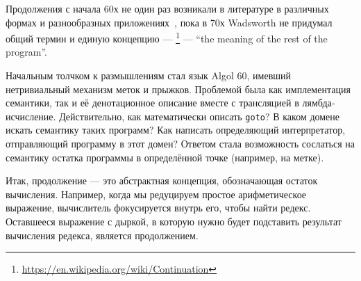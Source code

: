 
Продолжения с начала 60х не один раз возникали в литературе в различных формах и разнообразных приложениях~\cite{reynolds1993discoveries, landin1997histories}, пока в 70х Wadsworth не придумал общий термин и единую концепцию --- \footnote{\url{https://en.wikipedia.org/wiki/Continuation}} --- ``the meaning of the rest of the program''.

Начальным толчком к размышлениям стал язык Algol 60, имевший нетривиальный механизм меток и прыжков.
Проблемой была как имплементация семантики, так и её денотационное описание вместе с трансляцией в лямбда-исчисление.
Действительно, как математически описать \texttt{goto}?
В каком домене искать семантику таких программ?
Как написать определяющий интерпретатор, отправляющий программу в этот домен?
Ответом стала возможность сослаться на семантику остатка программы в определённой точке (например, на метке).

Итак, продолжение --- это абстрактная концепция, обозначающая остаток вычисления.
Например, когда мы редуцируем простое арифметическое выражение, вычислитель фокусируется внутрь его, чтобы найти редекс.
Оставшееся выражение с дыркой, в которую нужно будет подставить результат вычисления редекса, является продолжением.

